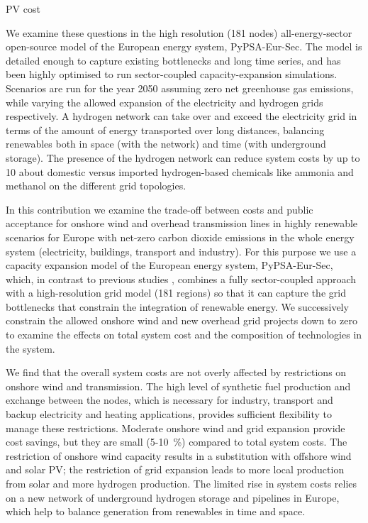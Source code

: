 PV cost
\cite{jaxa-rozenSourcesUncertainty2021,victoriaSolarPhotovoltaics2021,xiaoPlummetingCosts2021}


We examine these questions in the high resolution (181 nodes)
all-energy-sector open-source model of the European energy system,
PyPSA-Eur-Sec. The model is detailed enough to capture existing
bottlenecks and long time series, and has been highly optimised to run
sector-coupled capacity-expansion simulations. Scenarios are run for the
year 2050 assuming zero net greenhouse gas emissions, while varying the
allowed expansion of the electricity and hydrogen grids respectively. A
hydrogen network can take over and exceed the electricity grid in terms
of the amount of energy transported over long distances, balancing
renewables both in space (with the network) and time (with underground
storage). The presence of the hydrogen network can reduce system costs
by up to 10%
about domestic versus imported hydrogen-based chemicals like ammonia and
methanol on the different grid topologies.

In this contribution we examine the trade-off between costs and public
acceptance for onshore wind and overhead transmission lines in highly
renewable scenarios for Europe with net-zero carbon dioxide emissions
in the whole energy system (electricity, buildings, transport and
industry). For this purpose we use a capacity expansion model of the
European energy system, PyPSA-Eur-Sec, which, in contrast to previous
studies \cite{henningComprehensiveModel2014,mathiesenSmartEnergy2015,IEESWV,connollySmartEnergy2016,lofflerDesigningModel2017,blancoPotentialHydrogen2018,brownSynergiesSector2018,in-depth_2018,victoria2020},
combines a fully sector-coupled approach with a high-resolution grid
model (181 regions) so that it can capture the grid bottlenecks that
constrain the integration of renewable energy.  We successively
constrain the allowed onshore wind and new overhead grid projects down
to zero to examine the effects on total system cost and the
composition of technologies in the system.

We find that the overall system costs are not overly affected
by restrictions on onshore wind and transmission. The high level of
synthetic fuel production and exchange between the nodes, which is
necessary for industry, transport and backup electricity and heating
applications, provides sufficient flexibility to manage these
restrictions. Moderate onshore wind and grid expansion provide cost
savings, but they are small (5-10~\%) compared to total system
costs. The restriction of onshore wind capacity results in a
substitution with offshore wind and solar PV; the restriction of grid
expansion leads to more local production from solar and more hydrogen
production. The limited rise in system costs relies on a new network
of underground hydrogen storage and pipelines in Europe, which help to balance
generation from renewables in time and space.

